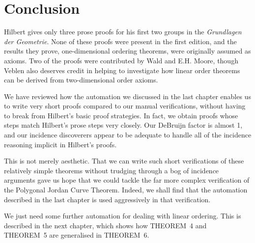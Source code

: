 \section{Conclusion}
Hilbert gives only three prose proofs for his first two groups in the \emph{Grundlagen der Geometrie}. None of these proofs were present in the first edition, and the results they prove, one-dimensional ordering theorems, were originally assumed as axioms. Two of the proofs were contributed by Wald and E.H. Moore, though Veblen also deserves credit in helping to investigate how linear order theorems can be derived from  two-dimensional order axioms.

We have reviewed how the automation we discussed in the last chapter enables us to write very short proofs compared to our manual verifications, without having to break from Hilbert's basic proof strategies. In fact, we obtain proofs whose steps match Hilbert's prose steps very closely. Our DeBruijn factor is almost 1, and our incidence discoverers appear to be adequate to handle all of the incidence reasoning implicit in Hilbert's proofs.

This is not merely aesthetic. That we can write such short verifications of these relatively simple theorems without trudging through a bog of incidence arguments gave us hope that we could tackle the far more complex verification of the Polygonal Jordan Curve Theorem. Indeed, we shall find that the automation described in the last chapter is used aggressively in that verification. 

We just need some further automation for dealing with linear ordering. This is described in the next chapter, which shows how THEOREM~4 and THEOREM~5 are generalised in THEOREM~6.


